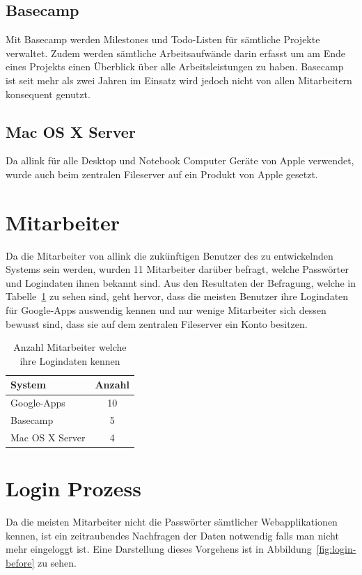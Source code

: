 \subsection{Basecamp}
\label{subs:Basecamp}
Mit Basecamp werden Milestones und Todo-Listen für sämtliche Projekte verwaltet. Zudem werden sämtliche Arbeitsaufwände darin erfasst um am Ende eines Projekts einen Überblick über alle Arbeitsleistungen zu haben. Basecamp ist seit mehr als zwei Jahren im Einsatz wird jedoch nicht von allen Mitarbeitern konsequent genutzt.

\subsection{Mac OS X Server}
\label{subs:Mac OS X Server}
Da allink für alle Desktop und Notebook Computer Geräte von Apple verwendet, wurde auch beim zentralen Fileserver auf ein Produkt von Apple gesetzt.

\section{Mitarbeiter}
\label{sec:Mitarbeiter}
Da die Mitarbeiter von allink die zukünftigen Benutzer des zu entwickelnden Systems sein werden, wurden 11 Mitarbeiter darüber befragt, welche Passwörter und Logindaten ihnen bekannt sind. Aus den Resultaten der Befragung, welche in Tabelle~\ref{tab:umfrage_passworter} zu sehen sind, geht hervor, dass die meisten Benutzer ihre Logindaten für Google-Apps auswendig kennen und nur wenige Mitarbeiter sich dessen bewusst sind, dass sie auf dem zentralen Fileserver ein Konto besitzen.

\begin{table}
  \centering
  \begin{tabular}
  	{|l | c|} \hline System & Anzahl\\
  	\hline Google-Apps & 10\\
  	\hline Basecamp & 5\\
  	\hline Mac OS X Server & 4\\
  	\hline 
  \end{tabular}
  \label{tab:umfrage_passworter}
  \caption{Anzahl Mitarbeiter welche ihre Logindaten kennen}
\end{table}

\section{Login Prozess}
\label{sec:Login Prozess}
Da die meisten Mitarbeiter nicht die Passwörter sämtlicher Webapplikationen kennen, ist ein zeitraubendes Nachfragen der Daten notwendig falls man nicht mehr eingeloggt ist. Eine Darstellung dieses Vorgehens ist in Abbildung~\ref{fig:login-before} zu sehen.

